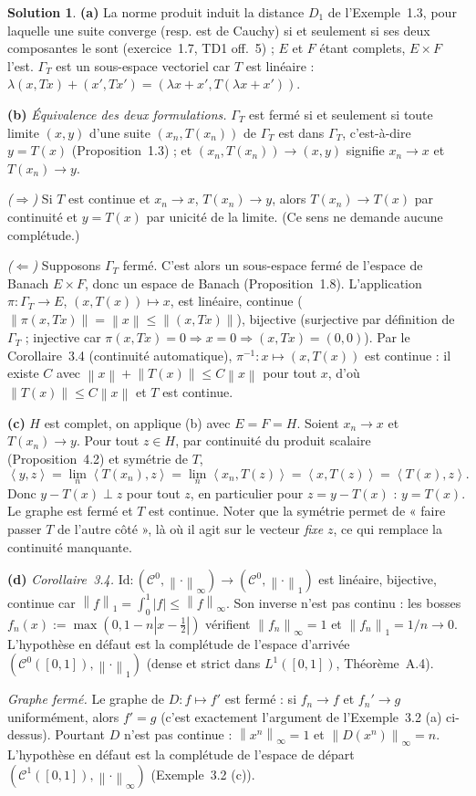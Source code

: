\documentclass[11pt,a4paper]{article}
\newcommand{\norm}[1]{\left\|#1\right\|}
\newcommand{\Cz}{\mathcal{C}^0}
\newcommand{\ie}{c'est-à-dire}
\newcommand{\ps}[2]{\left\langle #1,#2\right\rangle}
\theoremstyle{definition}
\newtheorem*{solution}{Solution}
\begin{document}
\begin{solution}
\noindent\textbf{(a)} La norme produit induit la distance $D_1$ de l'Exemple~1.3, pour laquelle une suite converge (resp. est de Cauchy) si et seulement si ses deux composantes le sont (exercice~1.7, TD1 off.~5) ; $E$ et $F$ étant complets, $E\times F$ l'est. $\Gamma_T$ est un sous-espace vectoriel car $T$ est linéaire : $\lambda(x,Tx)+(x',Tx')=(\lambda x+x',T(\lambda x+x'))$.

\medskip
\noindent\textbf{(b)} \emph{Équivalence des deux formulations.} $\Gamma_T$ est fermé si et seulement si toute limite $(x,y)$ d'une suite $(x_n,T(x_n))$ de $\Gamma_T$ est dans $\Gamma_T$, \ie{} $y=T(x)$ (Proposition~1.3) ; et $(x_n,T(x_n))\to(x,y)$ signifie $x_n\to x$ et $T(x_n)\to y$.

\emph{($\Rightarrow$)} Si $T$ est continue et $x_n\to x$, $T(x_n)\to y$, alors $T(x_n)\to T(x)$ par continuité et $y=T(x)$ par unicité de la limite. (Ce sens ne demande aucune complétude.)

\emph{($\Leftarrow$)} Supposons $\Gamma_T$ fermé. C'est alors un sous-espace fermé de l'espace de Banach $E\times F$, donc un espace de Banach (Proposition~1.8). L'application $\pi:\Gamma_T\to E$, $(x,T(x))\mapsto x$, est linéaire, continue ($\norm{\pi(x,Tx)}=\norm x\le\norm{(x,Tx)}$), bijective (surjective par définition de $\Gamma_T$ ; injective car $\pi(x,Tx)=0\Rightarrow x=0\Rightarrow(x,Tx)=(0,0)$). Par le Corollaire~3.4 (continuité automatique), $\pi^{-1}:x\mapsto(x,T(x))$ est continue : il existe $C$ avec $\norm x+\norm{T(x)}\le C\norm x$ pour tout $x$, d'où $\norm{T(x)}\le C\norm x$ et $T$ est continue.

\medskip
\noindent\textbf{(c)} $H$ est complet, on applique (b) avec $E=F=H$. Soient $x_n\to x$ et $T(x_n)\to y$. Pour tout $z\in H$, par continuité du produit scalaire (Proposition~4.2) et symétrie de $T$,
\[
\ps yz=\lim_n\ps{T(x_n)}z=\lim_n\ps{x_n}{T(z)}=\ps x{T(z)}=\ps{T(x)}z .
\]
Donc $y-T(x)\perp z$ pour tout $z$, en particulier pour $z=y-T(x)$ : $y=T(x)$. Le graphe est fermé et $T$ est continue. Noter que la symétrie permet de « faire passer $T$ de l'autre côté », là où il agit sur le vecteur \emph{fixe} $z$, ce qui remplace la continuité manquante.

\medskip
\noindent\textbf{(d)} \emph{Corollaire~3.4.} $\mathrm{Id}:(\Cz,\norm\cdot_\infty)\to(\Cz,\norm\cdot_1)$ est linéaire, bijective, continue car $\norm f_1=\int_0^1|f|\le\norm f_\infty$. Son inverse n'est pas continu : les bosses $f_n(x):=\max(0,1-n|x-\tfrac12|)$ vérifient $\norm{f_n}_\infty=1$ et $\norm{f_n}_1=1/n\to0$. L'hypothèse en défaut est la complétude de l'espace d'arrivée $(\Cz([0,1]),\norm\cdot_1)$ (dense et strict dans $L^1([0,1])$, Théorème~A.4).

\emph{Graphe fermé.} Le graphe de $D:f\mapsto f'$ est fermé : si $f_n\to f$ et $f_n'\to g$ uniformément, alors $f'=g$ (c'est exactement l'argument de l'Exemple~3.2 (a) ci-dessus). Pourtant $D$ n'est pas continue : $\norm{x^n}_\infty=1$ et $\norm{D(x^n)}_\infty=n$. L'hypothèse en défaut est la complétude de l'espace de départ $(\mathcal C^1([0,1]),\norm\cdot_\infty)$ (Exemple~3.2 (c)).
\end{solution}
\end{document}
